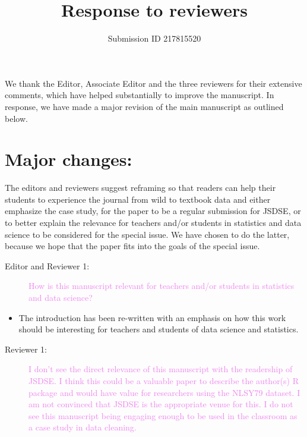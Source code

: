 \documentclass[12pt,a4paper,]{article}
\title{Response to reviewers}
\date{Submission ID 217815520}
\providecommand{\tightlist}{%
  \setlength{\itemsep}{0pt}\setlength{\parskip}{0pt}}
\begin{document}
\vspace*{-2cm}
\begin{snugshade}\sffamily
\maketitle
\end{snugshade}\vspace*{0.5cm}


We thank the Editor, Associate Editor and the three reviewers for their extensive comments, which have helped substantially to improve the manuscript. In response, we have made a major revision of the main manuscript as outlined below.

\section*{Major changes:}

The editors and reviewers suggest reframing so that readers can help their students to experience the journal from wild to textbook data and either emphasize the case study, for the paper to be a regular submission for JSDSE, or to better explain the relevance for teachers and/or students in statistics and data science to be considered for the special issue. We have chosen to do the latter, because we hope that the paper fits into the goals of the special issue.

\begin{description}
\item[Editor and Reviewer 1:] \textcolor{violet}{How is this manuscript relevant for teachers and/or students in statistics and data science?}
\end{description}

\begin{itemize}
\tightlist
\item
  The introduction has been re-written with an emphasis on how this work should be interesting for teachers and students of data science and statistics.
\end{itemize}

\begin{description}
\item[Reviewer 1:] \textcolor{violet}{I don't see the direct relevance of this manuscript with the readership of JSDSE. I think this could be a valuable paper to describe the author(s) R package and would have value for researchers using the NLSY79 dataset. I am not convinced that JSDSE is the appropriate venue for this. I do not see this manuscript being engaging enough to be used in the classroom as a case study in data cleaning.}
\end{description}
\end{document}
